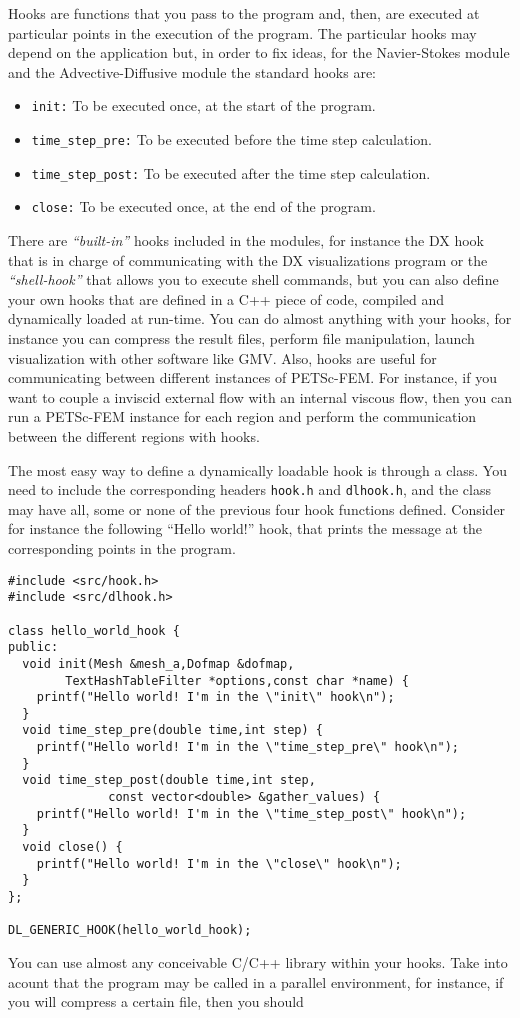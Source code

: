 
Hooks are functions that you pass to the program and, then, are
executed at particular points in the execution of the program. The
particular hooks may depend on the application but, in order to fix
ideas, for the Navier-Stokes module and the Advective-Diffusive
module the standard hooks are: 
%
\begin{itemize}
\item{\tt init:} To be executed once, at the start of the program. 
\item{\tt time\_step\_pre:} To be executed before the time step
calculation. 
\item{\tt time\_step\_post:} To be executed after the time step
calculation. 
\item{\tt close:} To be executed once, at the end of the program. 
\end{itemize}
%
There are \emph{``built-in''} hooks included in the modules, for
instance the DX hook that is in charge of communicating with the DX
visualizations program or the \emph{``shell-hook''} that allows you to
execute shell commands, but you can also define your own hooks that
are defined in a C++ piece of code, compiled and dynamically loaded at
run-time. You can do almost anything with your hooks, for instance you
can compress the result files, perform file manipulation, launch
visualization with other software like GMV. Also, hooks are useful
for communicating between different instances of PETSc-FEM. For
instance, if you want to couple a inviscid external flow with an
internal viscous flow, then you can run a PETSc-FEM instance for each
region and perform the communication between the different regions
with hooks. 


The most easy way to define a dynamically loadable hook is through a
class. You need to include the corresponding headers {\tt hook.h} and
{\tt dlhook.h}, and the class may have all, some or none of the
previous four hook functions defined. Consider for instance the
following ``Hello world!'' hook, that prints the message at the
corresponding points in the program. 

\begin{verbatim}
#include <src/hook.h>
#include <src/dlhook.h>

class hello_world_hook {
public:
  void init(Mesh &mesh_a,Dofmap &dofmap,
	    TextHashTableFilter *options,const char *name) {
    printf("Hello world! I'm in the \"init\" hook\n");
  }
  void time_step_pre(double time,int step) {
    printf("Hello world! I'm in the \"time_step_pre\" hook\n");
  }
  void time_step_post(double time,int step,
		      const vector<double> &gather_values) {
    printf("Hello world! I'm in the \"time_step_post\" hook\n");
  }
  void close() {
    printf("Hello world! I'm in the \"close\" hook\n");
  }
};

DL_GENERIC_HOOK(hello_world_hook);
\end{verbatim}

You can use almost any conceivable C/C++ library within your hooks. Take
into acount that the program may be called in a parallel environment,
for instance, if you will compress a certain file, then you should 




